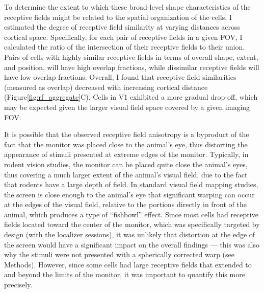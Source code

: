 To determine the extent to which these broad-level shape characteristics of the receptive fields might be related to the spatial organization of the cells, I estimated the degree of receptive field similarity at varying distances across cortical space. Specifically, for each pair of receptive fields in a given FOV, I calculated the ratio of the intersection of their receptive fields to their union. Pairs of cells with highly similar receptive fields in terms of overall shape, extent, and position, will have high overlap fractions, while dissimilar receptive fields will have low overlap fractions. Overall, I found that receptive field similarities (measured as overlap) decreased with increasing cortical distance (Figure\ref{fig:rf_aggregate}C). Cells in V1 exhibited a more gradual drop-off, which may be expected given the larger visual field space covered by a given imaging FOV. 



It is possible that the observed receptive field anisotropy is a byproduct of the fact that the monitor was placed close to the animal's eye, thus distorting the appearance of stimuli presented at extreme edges of the monitor. Typically, in rodent vision studies, the monitor can be placed quite close the animal's eyes, thus covering a much larger extent of the animal's visual field, due to the fact that rodents have a large depth of field\cite{Balkema1982}. In standard visual field mapping studies, the screen is close enough to the animal's eye that significant warping can occur at the edges of the visual field, relative to the portions directly in front of the animal, which produces a type of ``fishbowl'' effect. Since most cells had receptive fields located toward the center of the monitor, which was specifically targeted by design (with the localizer sessions), it was unlikely that distortion at the edge of the screen would have a significant impact on the overall findings --- this was also why the stimuli were not presented with a spherically corrected warp (see Methods). However, since some cells had large receptive fields that extended to and beyond the limits of the monitor, it was important to quantify this more precisely. 

